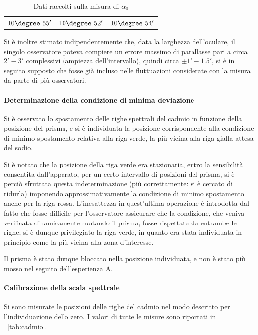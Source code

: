 \documentclass[a4paper,10pt]{article}
\begin{document}
\begin{table}[H]
	\centering
	\begin{tabular}{c|c|c}
		$10\degree~55'$  & $10\degree~52'$ & $10\degree~54'$\\
	\end{tabular}
\caption{Dati raccolti sulla misura di $\alpha_0$}
\end{table}

Si è inoltre stimato indipendentemente che, data la larghezza dell'oculare, il singolo osservatore poteva compiere un errore massimo di parallasse pari a circa $2'-3'$ complessivi (ampiezza dell'intervallo), quindi circa $\pm 1'-1.5'$, si è in seguito supposto che fosse già incluso nelle fluttuazioni considerate con la misura da parte di più osservatori.

\paragraph{Determinazione della condizione di minima deviazione} Si è osservato lo spostamento delle righe spettrali del cadmio in funzione della posizione del prisma, e si è individuata la posizione corrispondente alla condizione di minimo spostamento relativa alla riga verde, la più vicina alla riga gialla attesa del sodio.

Si è notato che la posizione della riga verde era stazionaria, entro la sensibilità consentita dall'apparato, per un certo intervallo di posizioni del prisma, si è perciò sfruttata questa indeterminazione (più correttamente: si è cercato di ridurla) imponendo approssimativamente la condizione di minimo spostamento anche per la riga rossa.
L'inesattezza in quest'ultima operazione è introdotta dal fatto che fosse difficile per l'osservatore assicurare che la condizione, che veniva verificata dinamicamente ruotando il prisma, fosse rispettata da entrambe le righe; si è dunque privilegiato la riga verde, in quanto era stata individuata in principio come la più vicina alla zona d'interesse.

Il prisma è stato dunque bloccato nella posizione individuata, e non è stato più mosso nel seguito dell'esperienza A.

\paragraph{Calibrazione della scala spettrale} 

Si sono misurate le posizioni delle righe del cadmio nel modo descritto per l'individuazione dello zero. I valori di tutte le misure sono riportati in \tablename{~\ref{tab:cadmio}}.
\end{document}
